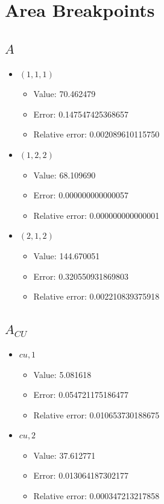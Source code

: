 \documentclass{article}%
\begin{document}
\section{Area Breakpoints}%
\thispagestyle{plain}%
\subsection{$A$}%
\begin{itemize}%
	\item $(1, 1, 1)$%
	\begin{itemize}%
		\item Value: 70.462479%
		\item Error: 0.147547425368657%
		\item Relative error: 0.002089610115750%
	\end{itemize}%
	\item $(1, 2, 2)$%
	\begin{itemize}%
		\item Value: 68.109690%
		\item Error: 0.000000000000057%
		\item Relative error: 0.000000000000001%
	\end{itemize}%
	\item $(2, 1, 2)$%
	\begin{itemize}%
		\item Value: 144.670051%
		\item Error: 0.320550931869803%
		\item Relative error: 0.002210839375918%
	\end{itemize}%
\end{itemize}%
\subsection{$A_{CU}$}%
\begin{itemize}%
	\item $\textit{cu},1$%
	\begin{itemize}%
		\item Value: 5.081618%
		\item Error: 0.054721175186477%
		\item Relative error: 0.010653730188675%
	\end{itemize}%
	\item $\textit{cu},2$%
	\begin{itemize}%
		\item Value: 37.612771%
		\item Error: 0.013064187302177%
		\item Relative error: 0.000347213217858%
	\end{itemize}%
\end{itemize}%
\end{document}

